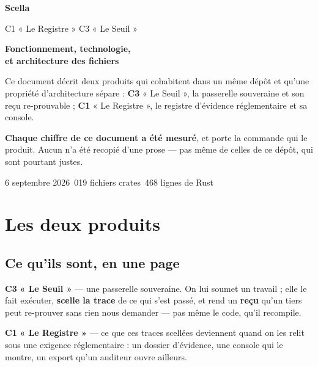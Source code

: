 \documentclass[10pt]{report}
\newcommand{\ctrois}{\textcolor{c3col}{\textbf{C3}}}
\newcommand{\cun}{\textcolor{c1col}{\textbf{C1}}}
\begin{document}
\begin{titlepage}
\centering
\vspace*{3.2cm}
{\color{navy}\Huge\bfseries Scella\par}
\vspace{0.7cm}
{\color{grey}\LARGE C1 « Le Registre » \quad\textbullet\quad C3 « Le Seuil »\par}
\vspace{1.6cm}
{\Large\bfseries Fonctionnement, technologie,\\[2pt] et architecture des fichiers\par}
\vspace{1.2cm}
\begin{minipage}{0.78\textwidth}
\begin{these}
\small
Ce document décrit deux produits qui cohabitent dans un même dépôt et
qu'une propriété d'architecture sépare : \ctrois{} « Le Seuil », la
passerelle souveraine et son reçu re-prouvable ; \cun{} « Le Registre »,
le registre d'évidence réglementaire et sa console.

\medskip
\textbf{Chaque chiffre de ce document a été mesuré}, et porte la commande qui
le produit. Aucun n'a été recopié d'une prose --- pas même de celles de ce
dépôt, qui sont pourtant justes.
\end{these}
\end{minipage}
\vfill
{\color{grey}\small 6 septembre 2026 \quad\textbullet{}\,019 fichiers \quad\textbullet{} crates \quad\textbullet{}\,468 lignes de Rust\par}
\end{titlepage}

\tableofcontents

\chapter{Les deux produits}

\section{Ce qu'ils sont, en une page}

\begin{these}
\ctrois{} \textbf{« Le Seuil »} --- une passerelle souveraine. On lui soumet un travail ; elle le
fait exécuter, \textbf{scelle la trace} de ce qui s'est passé, et rend un \textbf{reçu} qu'un tiers
peut re-prouver sans rien nous demander --- pas même le code, qu'il recompile.

\medskip
\cun{} \textbf{« Le Registre »} --- ce que ces traces scellées deviennent quand on les relit sous
une exigence réglementaire : un dossier d'évidence, une console qui le montre, un export qu'un
auditeur ouvre ailleurs.
\end{these}
\end{document}
